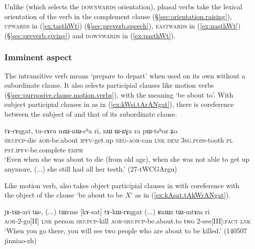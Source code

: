 Unlike  (which selects the \textsc{downwards} orientation), phasal verbs take the lexical orientation of the verb in the complement clause (§\ref{sec:orientation.raising}), \textsc{upwards} in (\ref{ex:tasthWt}) (§\ref{sec:preverb.speech}), \textsc{eastwards} in (\ref{ex:nasthWt}) (§\ref{sec:preverb.giving}) and \textsc{downwards} in (\ref{ex:pasthWt}).

\subsubsection{Imminent aspect} \label{sec:imminent.complements}
The intransitive verb  means `prepare to depart' when used on its own without a subordinate clause. It also selects participial clauses like motion verbs (§\ref{sec:purposive.clause.motion.verbs}), with the meaning `be about to'. With subject participial clauses in  as in (\ref{ex:kWsi.tArANgat}), there is coreference between the subject of  and that of its subordinate clause.


\begin{exe}
\ex \label{ex:kWsi.tArANgat}
 \gll [kɯ-si] tɤ-rɤŋgat, tu-rɤru mɯ-nɯ-cʰa ri, { } nɯ ɯ-ɕɣa ra pɯ-tsʰoz ʑo. \\
 \textsc{sbj}:\textsc{pcp}-die \textsc{aor}-be.about \textsc{ipfv}-get.up \textsc{neg}-\textsc{aor}-can \textsc{lnk} {  } \textsc{dem} \textsc{3sg}.\textsc{poss}-tooth \textsc{pl} \textsc{pst}.\textsc{ipfv}-be.complete \textsc{emph} \\
 \glt `Even when she was about to die (from old age), when she was not able to get up anymore, (...) she still had all her teeth.' (27-tWCGArgu)
\end{exe}

Like motion verb,  also takes object participial clauses in  with coreference with the object of the clause `be about to be $X$' as in (\ref{ex:kAsat.tAkWrANgat}).

\begin{exe}
\ex \label{ex:kAsat.tAkWrANgat}
 \gll jɤ-tɯ-ari tɕe, (...)  tɯrme [kɤ-sat] tɤ-kɯ-rɤŋgat (...) ʁnɯz tɯ-mtɤm ri \\
 \textsc{aor}-2-go[II] \textsc{lnk} {  } person \textsc{sbj}:\textsc{pcp}-kill \textsc{aor}-\textsc{sbj}:\textsc{pcp}-be.about.to {  } two 2-see[III]:\textsc{fact} \textsc{lnk} \\
 \glt `When you go there, you will see two people who are about to be killed.' (140507 jinniao-zh)
\end{exe} 

